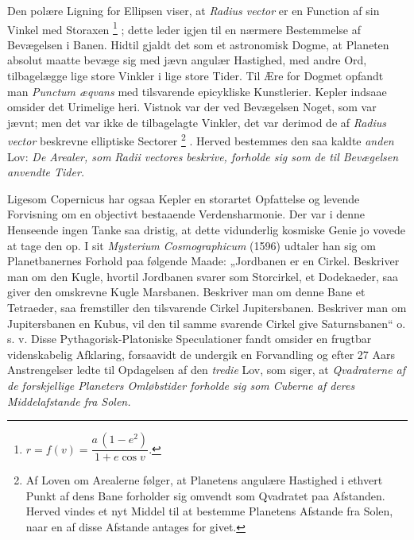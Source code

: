 \documentclass[12pt,a4paper]{book}
\renewcommand{\thefootnote}{*)}
\begin{document}
Den polære Ligning for Ellipsen viser, at \textit{Radius vector} er en
Function af sin Vinkel med Storaxen%
\renewcommand{\thefootnote}{**)}%
\footnote{%
$r = f(v) = \dfrac{a\,(1 - e^{2})}{1 + e \cos v}.$}%
\renewcommand{\thefootnote}{*)}%
; dette leder igjen til en nærmere Bestemmelse af Bevægelsen i Banen.
Hidtil gjaldt det som et astronomisk Dogme, at Planeten absolut maatte
bevæge sig med jævn angulær Hastighed, med andre Ord, tilbagelægge lige
store Vinkler i lige store Tider. Til Ære for Dogmet opfandt man
\textit{Punctum æqvans} med tilsvarende epicykliske Kunstlerier. Kepler
indsaae omsider det Urimelige heri. Vistnok var der ved Bevægelsen
Noget, som var jævnt; men det var ikke de tilbagelagte Vinkler, det var
derimod de af \textit{Radius vector} beskrevne elliptiske Sectorer%
\renewcommand{\thefootnote}{***)}%
\footnote{%
Af Loven om Arealerne følger, at Planetens angulære Hastighed i ethvert
Punkt af dens Bane forholder sig omvendt som Qvadratet paa Afstanden.
Herved vindes et nyt Middel til at bestemme Planetens Afstande fra
Solen, naar en af disse Afstande antages for givet.}%
\renewcommand{\thefootnote}{*)}%
. Herved bestemmes den saa\-%
kaldte \emph{anden} Lov: \emph{De Arealer, som} \textit{Radii vectores}
\emph{beskrive, forholde sig som de til Bevægelsen anvendte Tider.}

Ligesom Copernicus har ogsaa Kepler en storartet Opfattelse og levende
Forvisning om en objectivt bestaaende Verdensharmonie. Der var i denne
Henseende ingen Tanke saa dristig, at dette vidunderlig kosmiske Genie
jo vovede at tage den op. I sit
\textit{Mysterium Cosmographicum} (1596) udtaler han sig om
Planetbanernes Forhold paa følgende Maade: „Jordbanen er en Cirkel.
Beskriver man om den Kugle, hvortil Jordbanen svarer som Storcirkel, et
Dodekaeder, saa giver den omskrevne Kugle Marsbanen. Beskriver man om
denne Bane et Tetraeder, saa fremstiller den tilsvarende Cirkel
Jupitersbanen. Beskriver man om Jupitersbanen en Kubus, vil den til
samme svarende Cirkel give Saturnsbanen“ o. s. v. Disse
Pythagorisk-Platoniske Speculationer fandt omsider en frugtbar
videnskabelig Afklaring, forsaavidt de undergik en Forvandling og efter
27 Aars Anstrengelser ledte til Opdagelsen af den \emph{tredie} Lov, som
siger, at \emph{Qvadraterne af de forskjellige Planeters Omløbstider
forholde sig som Cuberne af deres Middelafstande fra Solen.}
\end{document}
